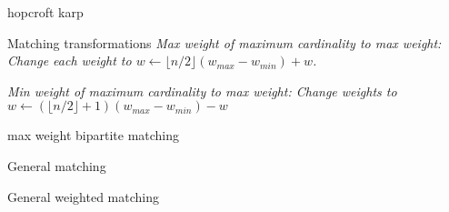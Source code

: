 
\begin{algorithm}{hopcroft karp}
\end{algorithm}


\begin{algorithm}{Matching transformations}
\desc
\em Max weight of maximum cardinality to max weight: \em
Change each weight to $w \leftarrow \lfloor n/2 \rfloor (w_{max}-w_{min}) + w$.

\em Min weight of maximum cardinality to max weight: \em
Change weights to $w \leftarrow (\lfloor n/2 \rfloor + 1)(w_{max}-w_{min}) -
w$

\end{algorithm}

\begin{algorithm}{max weight bipartite matching}
\end{algorithm}




\begin{algorithm}{General matching}
\end{algorithm}

\begin{algorithm}{General weighted matching}
\end{algorithm}
